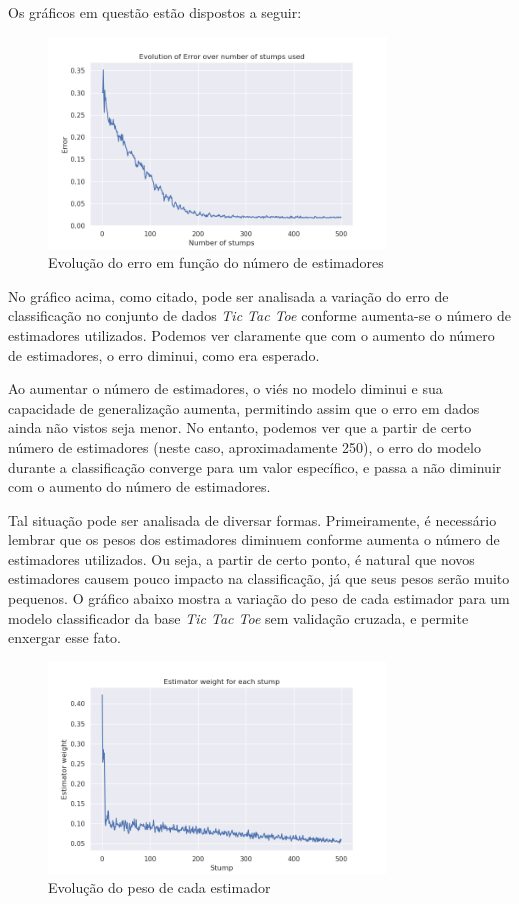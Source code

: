 \documentclass{article}
\begin{document}
Os gráficos em questão estão dispostos a seguir:

\begin{figure}[H]
    \centering
    \includegraphics[width=0.8\textwidth]{images/Error.png}
    \caption{Evolução do erro em função do número de estimadores}
\end{figure}

No gráfico acima, como citado, pode ser analisada a variação do erro de
classificação no conjunto de
dados \textit{Tic Tac Toe} conforme aumenta-se o número de estimadores
utilizados. Podemos ver claramente que
com o aumento do número de estimadores, o erro diminui, como era esperado.

Ao aumentar o número de estimadores, o viés no modelo diminui e sua capacidade
de generalização aumenta,
permitindo assim que o erro em dados ainda não vistos seja menor. No entanto,
podemos ver que a partir de certo número
de estimadores (neste caso, aproximadamente 250), o erro do modelo durante a
classificação converge
para um valor específico, e passa a não diminuir com o aumento do número de
estimadores.

Tal situação pode ser analisada de diversar formas. Primeiramente, é necessário
lembrar que os pesos dos estimadores
diminuem conforme aumenta o número de estimadores utilizados. Ou seja, a partir
de certo ponto, é natural que
novos estimadores causem pouco impacto na classificação, já que seus pesos
serão muito pequenos. O gráfico abaixo
mostra a variação do peso de cada estimador para um modelo classificador da
base \textit{Tic Tac Toe} sem validação cruzada, e permite enxergar esse fato.

\begin{figure}[H]
    \centering
    \includegraphics[width=0.8\textwidth]{images/Estimatorweight.png}
    \caption{Evolução do peso de cada estimador}
\end{figure}
\end{document}
